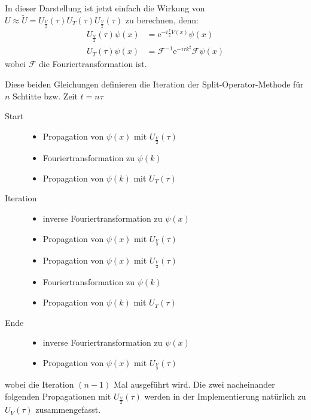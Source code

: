 \documentclass[10pt,a4paper,german]{scrartcl}
\begin{document}
		In dieser Darstellung ist jetzt einfach die Wirkung von
		$U \approx \tilde{U}=U_{\frac{V}{2}}(\tau) U_T(\tau) U_{\frac{V}{2}}(\tau)$ zu berechnen,
		denn:
		\begin{align}
		\label{it:hV}
			U_{\frac{V}{2}}(\tau) \psi(x) &= \mathrm{e}^{-i \frac{\tau}{2} V(x)} \psi(x)\\
		\label{it:T}
			U_T(\tau) \psi(x) &= \mathcal{F}^{-1} \mathrm{e}^{-i \tau k^2} \mathcal{F} \psi(x)
		\end{align}
		wobei $\mathcal{F}$ die Fouriertransformation ist.
		
		Diese beiden Gleichungen definieren die Iteration der Split-Operator-Methode
		für $n$ Schtitte bzw. Zeit $t=n \tau$
		
		\begin{description}
			\item[Start]
				\begin{itemize}
					\item Propagation von $\psi(x)$ mit $U_{\frac{V}{2}}(\tau)$
					\item Fouriertransformation zu $\psi(k)$
					\item Propagation von $\psi(k)$ mit $U_T(\tau)$
				\end{itemize}
			\item[Iteration]
				\begin{itemize}
					\item inverse Fouriertransformation zu $\psi(x)$
					\item Propagation von $\psi(x)$ mit $U_{\frac{V}{2}}(\tau)$
					\item Propagation von $\psi(x)$ mit $U_{\frac{V}{2}}(\tau)$
					\item Fouriertransformation zu $\psi(k)$
					\item Propagation von $\psi(k)$ mit $U_T(\tau)$
				\end{itemize}
			\item[Ende]
				\begin{itemize}
					\item inverse Fouriertransformation zu $\psi(x)$
					\item Propagation von $\psi(x)$ mit $U_{\frac{V}{2}}(\tau)$
				\end{itemize}
		\end{description}
		wobei die Iteration $(n-1)$ Mal ausgeführt wird. Die zwei nacheinander folgenden
		Propagationen mit $U_{\frac{V}{2}}(\tau)$ werden in der Implementierung natürlich
		zu $U_V(\tau)$ zusammengefasst.
		
\end{document}
